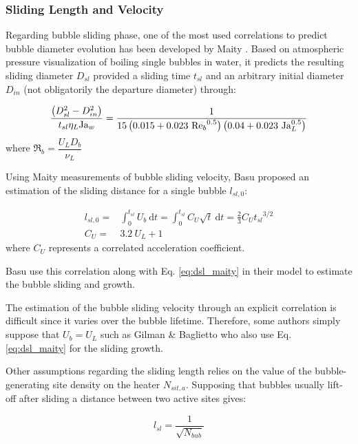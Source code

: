 \subsubsection{Sliding Length and Velocity}

Regarding bubble sliding phase, one of the most used correlations to predict bubble diameter evolution has been developed by Maity \cite{maity_effect_2000}. Based on atmospheric pressure visualization of boiling single bubbles in water, it predicts the resulting sliding diameter $D_{sl}$ provided a sliding time $t_{sl}$ and an arbitrary initial diameter $D_{in}$ (not obligatorily the departure diameter) through:

\begin{equation}
\frac{\parth{D_{sl}^{2} - D_{in}^{2}} }{t_{sl} \eta_{L} \Ja_{w}} = \frac{1}{15\parth{0.015+0.023\ {\Re_{b}}^{0.5} } \parth{0.04+0.023\ \Ja_{L}^{0.5}} }
\label{eq:dsl_maity}
\end{equation}
where $\Re_{b}=\dfrac{U_{L}D_{b}}{\nu_{L}}$


Using Maity measurements of bubble sliding velocity, Basu \etal proposed an estimation of the sliding distance for a single bubble $l_{sl,0}$:

\begin{align}
l_{sl,0}=& \int_{0}^{t_{sl}} U_{b}\ \mathrm{d}t = \int_{0}^{t_{sl}}C_{U} \sqrt{t}\ \mathrm{d}t =  \frac{2}{3}C_{U}{t_{sl}}^{3/2}
\label{eq:lsl_basu}\\
%
C_{U} =& 3.2\ U_{L}+1
\end{align}
where $C_{U}$ represents a correlated acceleration coefficient.

\begin{note*}{}
Basu \etal use this correlation along with Eq. \ref{eq:dsl_maity} in their model to estimate the bubble sliding and growth.

The estimation of the bubble sliding velocity through an explicit correlation is difficult since it varies over the bubble lifetime. Therefore, some authors simply suppose that $U_{b} = U_{L}$ such as Gilman \& Baglietto who also use Eq. \ref{eq:dsl_maity} for the sliding growth.
\end{note*}


Other assumptions regarding the sliding length relies on the value of the bubble-generating site density on the heater $N_{sit,a}$. Supposing that bubbles usually lift-off after sliding a distance between two active sites gives:

\begin{equation}
l_{sl} = \frac{1}{\sqrt{N_{bub}}}
\label{eq:lsl_avgdist_bub}
\end{equation}

